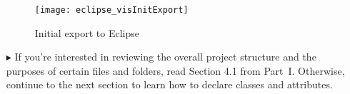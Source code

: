 \begin{itemize}
\clearpage

\vspace*{2cm}

\begin{figure}[htbp]
	\centering
  \texttt{[image: eclipse\_visInitExport]}
	\caption{Initial export to Eclipse}
	\label{eclipse:initExport}
\end{figure}

\vspace{1cm}

\item[$\blacktriangleright$] If you're interested in reviewing the overall project structure and the purposes of certain files and folders, read Section 4.1
from Part~I. Otherwise, continue to the next section to learn how to declare classes and attributes.

\end{itemize}
